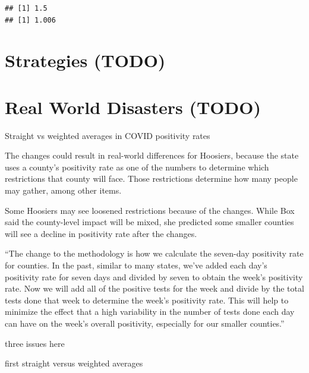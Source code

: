 \documentclass[
]{krantz}
\renewenvironment{quote}{\begin{VF}}{\end{VF}}
\begin{document}
\begin{verbatim}
## [1] 1.5
## [1] 1.006
\end{verbatim}

\hypertarget{strategies-todo-1}{%
\section{Strategies (TODO)}\label{strategies-todo-1}}

\hypertarget{real-world-disasters-todo}{%
\section{Real World Disasters (TODO)}\label{real-world-disasters-todo}}

Straight vs weighted averages in COVID positivity rates \citep{indy_rates}

\begin{quote}
The changes could result in real-world differences for Hoosiers, because the state uses a county's positivity rate as one of the numbers to determine which restrictions that county will face. Those restrictions determine how many people may gather, among other items.
\end{quote}

\begin{quote}
Some Hoosiers may see loosened restrictions because of the changes. While Box said the county-level impact will be mixed, she predicted some smaller counties will see a decline in positivity rate after the changes.
\end{quote}

\begin{quote}
``The change to the methodology is how we calculate the seven-day positivity rate for counties. In the past, similar to many states, we've added each day's positivity rate for seven days and divided by seven to obtain the week's positivity rate. Now we will add all of the positive tests for the week and divide by the total tests done that week to determine the week's positivity rate. This will help to minimize the effect that a high variability in the number of tests done each day can have on the week's overall positivity, especially for our smaller counties.''
\end{quote}

three issues here

first straight versus weighted averages
\end{document}
